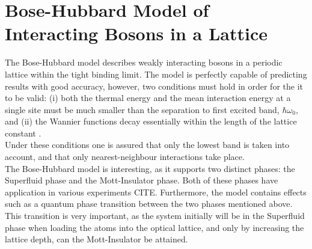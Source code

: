 \chapter{Bose-Hubbard Model of Interacting Bosons in a Lattice}
The Bose-Hubbard model describes weakly interacting bosons in a periodic lattice within the tight binding limit. The model is perfectly capable of predicting results with good accuracy, however, two conditions must hold in order for the it to be valid: (i) both the thermal energy and the mean interaction energy at a single site must be much smaller than the separation to first excited band, $\hbar \omega_0$, and (ii) the Wannier functions decay essentially within the length of the lattice constant \cite{manybodyBloch}.\\
Under these conditions one is assured that only the lowest band is taken into account, and that only nearest-neighbour interactions take place.\\
The Bose-Hubbard model is interesting, as it supports two distinct phases: the Superfluid phase and the Mott-Insulator phase. Both of these phases have application in various experiments CITE. Furthermore, the model contains effects such as a quantum phase transition between the two phases mentioned above. This transition is very important, as the system initially will be in the Superfluid phase when loading the atoms into the optical lattice, and only by increasing the lattice depth, can the Mott-Insulator be attained. 


